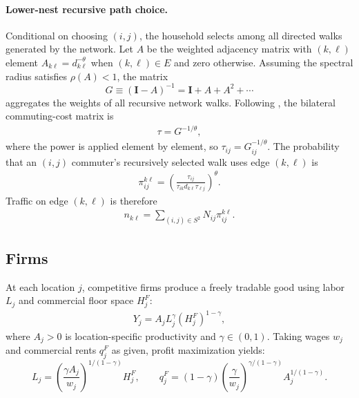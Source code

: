 \documentclass[12pt, a4paper]{article}
\theoremstyle{definition}
\theoremstyle{remark}
\begin{document}
\paragraph{Lower-nest recursive path choice.}
Conditional on choosing $(i,j)$, the household selects among all directed walks generated by the network. Let $A$ be the weighted adjacency matrix with $(k,\ell)$ element $A_{k\ell}=d_{k\ell}^{-\theta}$ when $(k,\ell)\in E$ and zero otherwise. Assuming the spectral radius satisfies $\rho(A)<1$, the matrix
\[
G\equiv(\mathbf I-A)^{-1}=\mathbf I+A+A^2+\cdots
\]
aggregates the weights of all recursive network walks. Following \citet{Allen2022-ms}, the bilateral commuting-cost matrix is
\begin{align}
    \label{eq:pi-route}
    \tau=G^{-1/\theta},
\end{align}
where the power is applied element by element, so $\tau_{ij}=G_{ij}^{-1/\theta}$. The probability that an $(i,j)$ commuter's recursively selected walk uses edge $(k,\ell)$ is
\begin{align}
    \label{eq:edge-intensity}
    \pi_{ij}^{k\ell}
    = \left(\frac{\tau_{ij}}
    {\tau_{ik}d_{k\ell}\tau_{\ell j}}\right)^{\theta}.
\end{align}
Traffic on edge $(k,\ell)$ is therefore
\begin{align}
    \label{eq:edge-traffic}
    n_{k\ell} = \sum_{(i,j)\in S^{2}}N_{ij}\pi_{ij}^{k\ell}.
\end{align}

\subsection{Firms}
\label{sec:firms}

At each location $j$, competitive firms produce a freely tradable good using labor $L_j$ and commercial floor space $H_j^F$:
\begin{align}
    \label{eq:firm-production}
Y_j = A_j L_j^{\gamma}(H_j^F)^{1-\gamma},
\end{align}
where $A_j > 0$ is location-specific productivity and $\gamma \in (0,1)$. Taking wages $w_j$ and commercial rents $q_j^F$ as given, profit maximization yields:
\[
L_{j}=(\frac{\gamma A_{j}}{w_{j}})^{1/(1-\gamma)}H_{j}^F, \qquad
q_{j}^F=(1-\gamma)(\frac{\gamma}{w_{j}})^{\gamma/(1-\gamma)}A_{j}^{1/(1-\gamma)}.
\]
\end{document}
